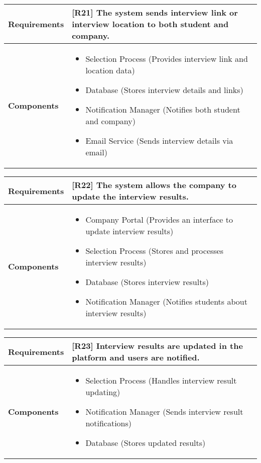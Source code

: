 \begin{table}[h!]
\centering
\begin{tabular}{|l|p{10cm}|}
\hline
\textbf{Requirements} & 
[R21] The system sends interview link or interview location to both student and company.\\
\hline
\textbf{Components} & 
\begin{itemize}
    \item Selection Process (Provides interview link and location data)
    \item Database (Stores interview details and links)
    \item Notification Manager (Notifies both student and company)
    \item Email Service (Sends interview details via email)
\end{itemize} \\
\hline
\end{tabular}
\label{tab:req_comp}
\end{table}

\begin{table}[h!]
\centering
\begin{tabular}{|l|p{10cm}|}
\hline
\textbf{Requirements} & 
[R22] The system allows the company to update the interview results.\\
\hline
\textbf{Components} & 
\begin{itemize}
    \item Company Portal (Provides an interface to update interview results)
    \item Selection Process (Stores and processes interview results)
    \item Database (Stores interview results)
    \item Notification Manager (Notifies students about interview results)
\end{itemize} \\
\hline
\end{tabular}
\label{tab:req_comp}
\end{table}

\begin{table}[h!]
\centering
\begin{tabular}{|l|p{10cm}|}
\hline
\textbf{Requirements} & 
[R23] Interview results are updated in the platform and users are notified.\\
\hline
\textbf{Components} & 
\begin{itemize}
    \item Selection Process (Handles interview result updating)
    \item Notification Manager (Sends interview result notifications)
    \item Database (Stores updated results)
\end{itemize} \\
\hline
\end{tabular}
\label{tab:req_comp}
\end{table}

